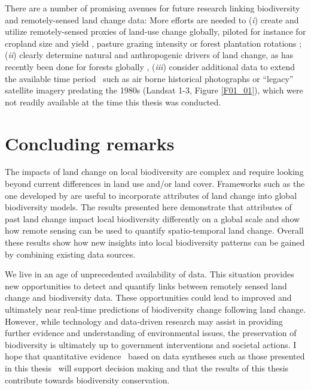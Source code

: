 There are a number of promising avenues for future research linking biodiversity and remotely-sensed land change data: More efforts are needed to (\textit{i}) create and utilize remotely-sensed proxies of land-use change globally, piloted for instance for cropland size \citep{Fritz2015} and yield \citep{Lobell2015}, pasture grazing intensity \citep{Rufin2015,Aguiar2017} or forest plantation rotations \citep{LeMaire2014}; (\textit{ii}) clearly determine natural and anthropogenic drivers of land change, as has recently been done for forests globally \citep{Curtis2018}, (\textit{iii}) consider additional data to extend the available time period \textendash\ such as air borne historical photographs \citep{SZABO2011,Cousins2015} or “legacy” satellite imagery predating the 1980s (\eg Landsat 1-3, Figure \ref{F01_01}), which were not readily available at the time this thesis was conducted.

\section{Concluding remarks}
\label{C06_05}

The impacts of land change on local biodiversity are complex and require looking beyond current differences in land use and/or land cover. Frameworks such as the one developed by \cite{Watson2014} are useful to incorporate attributes of land change into global biodiversity models. The results presented here demonstrate that attributes of past land change impact local biodiversity differently on a global scale and show how remote sensing can be used to quantify spatio-temporal land change. Overall these results show how new insights into local biodiversity patterns can be gained by combining existing data sources.

We live in an age of unprecedented availability of data. This situation provides new opportunities to detect and quantify links between remotely sensed land change and biodiversity data. These opportunities could lead to improved and ultimately near real-time predictions of biodiversity change following land change. However, while technology and data-driven research may assist in providing further evidence and understanding of environmental issues, the preservation of biodiversity is ultimately up to government interventions and societal actions. I hope that quantitative evidence \textendash\ based on data syntheses such as those presented in this thesis \textendash\ will support decision making and that the results of this thesis contribute towards biodiversity conservation.    


\clearpage
%

%  
